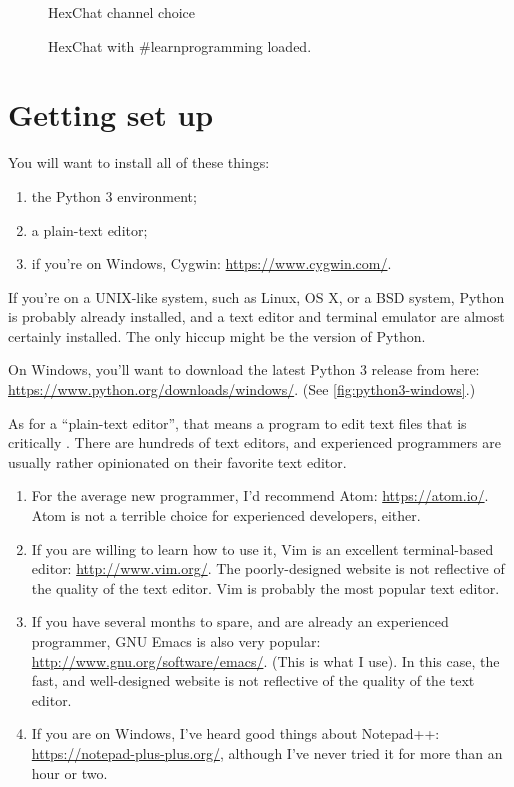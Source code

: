 \begin{figure}
  \centering
  \caption{HexChat channel choice}
  \label{fig:hexchat02}
\end{figure}

\begin{figure}
  \centering
  \caption{HexChat with \#learnprogramming loaded.}
  \label{fig:hexchat03}
\end{figure}

\section{Getting set up}

You will want to install all of these things:

\begin{enumerate}
\item the Python 3 environment;
\item a plain-text editor;
\item if you're on Windows, Cygwin: \url{https://www.cygwin.com/}.
\end{enumerate}

If you're on a UNIX-like system, such as Linux, OS X, or a BSD system,
Python is probably already installed, and a text editor and terminal
emulator are almost certainly installed. The only hiccup might be the
version of Python.

On Windows, you'll want to download the latest Python 3 release from
here: \url{https://www.python.org/downloads/windows/}. (See
\cref{fig:python3-windows}.)

As for a ``plain-text editor'', that means a program to edit text
files that is critically . There are
hundreds of text editors, and experienced programmers are usually
rather opinionated on their favorite text editor.

\begin{enumerate}
\item For the average new programmer, I'd recommend Atom:
  \url{https://atom.io/}. Atom is not a terrible choice for
  experienced developers, either.
\item If you are willing to learn how to use it, Vim is an excellent
  terminal-based editor: \url{http://www.vim.org/}. The
  poorly-designed website is not reflective of the quality of the text
  editor. Vim is probably the most popular text editor.
\item If you have several months to spare, and are already an
  experienced programmer, GNU Emacs is also very popular:
  \url{http://www.gnu.org/software/emacs/}. (This is what I use). In
  this case, the fast, and well-designed website is not reflective of
  the quality of the text editor.
\item If you are on Windows, I've heard good things about Notepad++:
  \url{https://notepad-plus-plus.org/}, although I've never tried it
  for more than an hour or two.
\end{enumerate}

